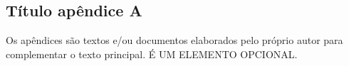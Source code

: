 
\begin{apendicesenv}
%
%
\chapter{Título apêndice A}
Os apêndices são textos e/ou documentos elaborados pelo próprio autor para complementar o texto principal. É UM ELEMENTO OPCIONAL.
%
%
%
%
%
%
%
%
\end{apendicesenv}